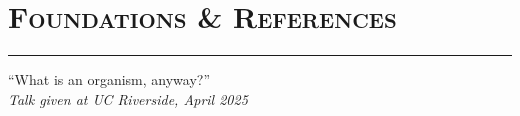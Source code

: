 \documentclass[]{article}
\makeatletter
\newcommand{\vhrulefill}[1]{\leavevmode\leaders\hrule\@height#1\hfill \kern\z@}
\makeatother
\begin{document}
\BgThispage
\pagestyle{alldocument}

\section*{\fontsize{16}{48}\selectfont \textsc{Foundations \& References}}
\vspace{-4mm}
\hspace{0.165\textwidth}\vhrulefill{0.4pt}

\begin{flushright}
``What is an organism, anyway?''\\
\textit{Talk given at UC Riverside, April 2025}
\end{flushright}

\vspace{-6mm}

\nocite{*} 


 
\end{document}
